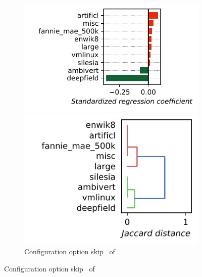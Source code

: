 \begin{figure}
	\begin{subfigure}{0.99\linewidth}
		\begin{minipage}{0.5\linewidth}
			\includegraphics[width=\linewidth]{images/plots/kanzi_skip_influences.pdf}
		\end{minipage}
		\begin{minipage}{0.5\linewidth}
			\includegraphics[width=0.8\linewidth]{images/plots/kanzi_skip_workloads.pdf}
		\end{minipage}
		\caption{Configuration option \guillemotleft\textsf{skip}\guillemotright~ of \kanzi}
		\label{fig:results_rq3_kanzi}
	\end{subfigure}


\end{figure}
